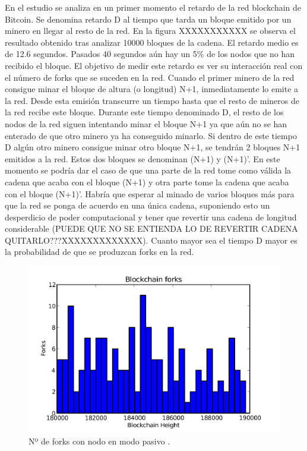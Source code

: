 En el estudio se analiza en un primer momento el retardo de la red blockchain de Bitcoin. Se denomina retardo D al tiempo que tarda un bloque emitido por un minero en llegar al resto de la red. En la figura XXXXXXXXXXX se observa el resultado obtenido tras analizar 10000 bloques de la cadena. El retardo medio es de 12.6 segundos. Pasados 40 segundos aún hay un 5\% de los nodos que no han recibido el bloque. El objetivo de medir este retardo es ver su interacción real con el número de forks que se suceden en la red. Cuando el primer minero de la red consigue minar el bloque de altura (o longitud) N+1, inmediatamente lo emite a la red. Desde esta emisión transcurre un tiempo hasta que el resto de mineros de la red recibe este bloque. Durante este tiempo denominado D, el resto de los nodos de la red siguen intentando minar el bloque N+1 ya que aún no se han enterado de que otro minero ya ha conseguido minarlo. Si dentro de este tiempo D algún otro minero consigue minar otro bloque N+1, se tendrán 2 bloques N+1 emitidos a la red. Estos dos bloques se denominan (N+1) y (N+1)’. En este momento se podría dar el caso de que una parte de la red tome como válida la cadena que acaba con el bloque (N+1) y otra parte tome la cadena que acaba con el bloque (N+1)’. Habría que esperar al minado de varios bloques más para que la red se ponga de acuerdo en una única cadena, suponiendo esto un desperdicio de poder computacional y tener que revertir una cadena de longitud considerable (PUEDE QUE NO SE ENTIENDA LO DE REVERTIR CADENA QUITARLO???XXXXXXXXXXXXX). Cuanto mayor sea el tiempo D mayor es la probabilidad de que se produzcan forks en la red.

\begin{figure}
	\centering
	\includegraphics[width=1\textwidth]{imagenes/figura2.PNG}
	\caption{\label{fig1}Nº de forks con nodo en modo pasivo \cite{forks}.}
\end{figure}

